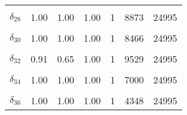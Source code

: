 \begin{table}
\begin{tabular}[t]{lrrrrrr}
\cellcolor{gray!6}{$\delta_{27}$} & \cellcolor{gray!6}{0.84} & \cellcolor{gray!6}{0.47} & \cellcolor{gray!6}{1.00} & \cellcolor{gray!6}{1} & \cellcolor{gray!6}{9677} & \cellcolor{gray!6}{24995}\\
$\delta_{28}$ & 1.00 & 1.00 & 1.00 & 1 & 8873 & 24995\\
\cellcolor{gray!6}{$\delta_{29}$} & \cellcolor{gray!6}{1.00} & \cellcolor{gray!6}{1.00} & \cellcolor{gray!6}{1.00} & \cellcolor{gray!6}{1} & \cellcolor{gray!6}{13862} & \cellcolor{gray!6}{24995}\\
$\delta_{30}$ & 1.00 & 1.00 & 1.00 & 1 & 8466 & 24995\\
\cellcolor{gray!6}{$\delta_{31}$} & \cellcolor{gray!6}{0.66} & \cellcolor{gray!6}{0.47} & \cellcolor{gray!6}{0.90} & \cellcolor{gray!6}{1} & \cellcolor{gray!6}{10884} & \cellcolor{gray!6}{10981}\\
$\delta_{32}$ & 0.91 & 0.65 & 1.00 & 1 & 9529 & 24995\\
\cellcolor{gray!6}{$\delta_{33}$} & \cellcolor{gray!6}{0.96} & \cellcolor{gray!6}{0.72} & \cellcolor{gray!6}{1.00} & \cellcolor{gray!6}{1} & \cellcolor{gray!6}{8265} & \cellcolor{gray!6}{24995}\\
$\delta_{34}$ & 1.00 & 1.00 & 1.00 & 1 & 7000 & 24995\\
\cellcolor{gray!6}{$\delta_{35}$} & \cellcolor{gray!6}{1.00} & \cellcolor{gray!6}{1.00} & \cellcolor{gray!6}{1.00} & \cellcolor{gray!6}{1} & \cellcolor{gray!6}{7191} & \cellcolor{gray!6}{24995}\\
$\delta_{36}$ & 1.00 & 1.00 & 1.00 & 1 & 4348 & 24995\\
\bottomrule
\end{tabular}
\end{table}